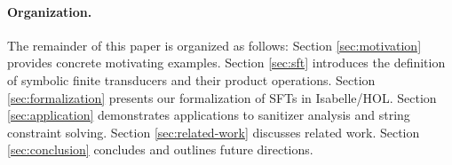 \paragraph{Organization.}
The remainder of this paper is organized as follows:
Section \ref{sec:motivation} provides concrete motivating examples.
Section \ref{sec:sft} introduces the definition of symbolic finite transducers and their product operations.
Section \ref{sec:formalization} presents our formalization of SFTs in Isabelle/HOL.
Section \ref{sec:application} demonstrates applications to sanitizer analysis and string constraint solving.
Section \ref{sec:related-work} discusses related work.
Section \ref{sec:conclusion} concludes and outlines future directions.
